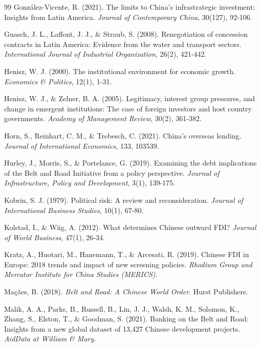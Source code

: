 \documentclass[12pt]{article}
\begin{document}
\begin{thebibliography}{99}
González-Vicente, R. (2021). The limits to China's infrastrategic investment: Insights from Latin America. \textit{Journal of Contemporary China}, 30(127), 92-106.

Guasch, J. L., Laffont, J. J., \& Straub, S. (2008). Renegotiation of concession contracts in Latin America: Evidence from the water and transport sectors. \textit{International Journal of Industrial Organization}, 26(2), 421-442.

Henisz, W. J. (2000). The institutional environment for economic growth. \textit{Economics \& Politics}, 12(1), 1-31.

Henisz, W. J., \& Zelner, B. A. (2005). Legitimacy, interest group pressures, and change in emergent institutions: The case of foreign investors and host country governments. \textit{Academy of Management Review}, 30(2), 361-382.

Horn, S., Reinhart, C. M., \& Trebesch, C. (2021). China's overseas lending. \textit{Journal of International Economics}, 133, 103539.

Hurley, J., Morris, S., \& Portelance, G. (2019). Examining the debt implications of the Belt and Road Initiative from a policy perspective. \textit{Journal of Infrastructure, Policy and Development}, 3(1), 139-175.

Kobrin, S. J. (1979). Political risk: A review and reconsideration. \textit{Journal of International Business Studies}, 10(1), 67-80.

Kolstad, I., \& Wiig, A. (2012). What determines Chinese outward FDI? \textit{Journal of World Business}, 47(1), 26-34.

Kratz, A., Huotari, M., Hanemann, T., \& Arcesati, R. (2019). Chinese FDI in Europe: 2018 trends and impact of new screening policies. \textit{Rhodium Group and Mercator Institute for China Studies (MERICS)}.

Maçães, B. (2018). \textit{Belt and Road: A Chinese World Order}. Hurst Publishers.

Malik, A. A., Parks, B., Russell, B., Lin, J. J., Walsh, K. M., Solomon, K., Zhang, S., Elston, T., \& Goodman, S. (2021). Banking on the Belt and Road: Insights from a new global dataset of 13,427 Chinese development projects. \textit{AidData at William \& Mary}.


\end{thebibliography}
\end{document}
